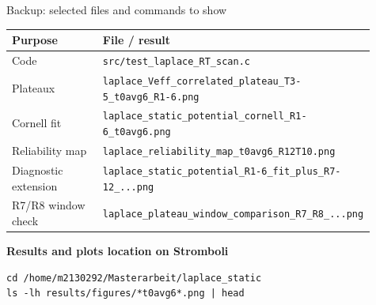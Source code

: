 \documentclass[11pt,rgb,ratio=169]{beamer}
\newif\ifbackupslide
\begin{document}
\backupslidetrue
\begin{frame}{Backup: selected files and commands to show}
\tiny
\begin{tabular}{@{}p{0.25\linewidth}p{0.66\linewidth}@{}}
\toprule
Purpose & File / result \\
\midrule
Code & \texttt{src/test\_laplace\_RT\_scan.c} \\
Plateaux & \texttt{laplace\_Veff\_correlated\_plateau\_T3-5\_t0avg6\_R1-6.png} \\
Cornell fit & \texttt{laplace\_static\_potential\_cornell\_R1-6\_t0avg6.png} \\
Reliability map & \texttt{laplace\_reliability\_map\_t0avg6\_R12T10.png} \\
Diagnostic extension & \texttt{laplace\_static\_potential\_R1-6\_fit\_plus\_R7-12\_...png} \\
R7/R8 window check & \texttt{laplace\_plateau\_window\_comparison\_R7\_R8\_...png} \\
\bottomrule
\end{tabular}
\vspace{2.7em}

\textbf{Results and plots location on Stromboli}\vspace{-0.9em}
\begin{verbatim}
cd /home/m2130292/Masterarbeit/laplace_static
ls -lh results/figures/*t0avg6*.png | head
\end{verbatim}
\end{frame}
\backupslidefalse
\end{document}
